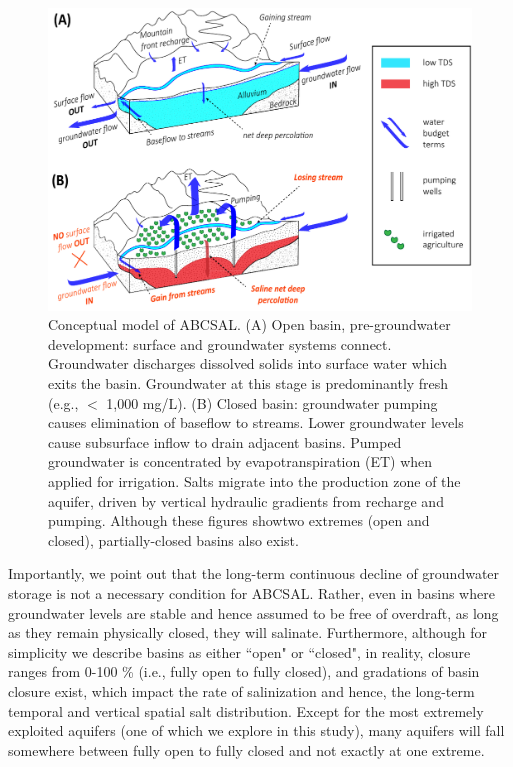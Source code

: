 \begin{figure}[ht]
	\includegraphics[width=\textwidth]{ch3_figs/mm_conceptual_model_gw_sal_2_stages.pdf}
	\caption{Conceptual model of ABCSAL. (A) Open basin, pre-groundwater development: surface and groundwater systems connect. Groundwater discharges dissolved solids into surface water which exits the basin. Groundwater at this stage is predominantly fresh (e.g., $<$ 1,000 mg/L). (B) Closed basin: groundwater pumping causes elimination of baseflow to streams. Lower groundwater levels cause subsurface inflow to drain adjacent basins. Pumped groundwater is concentrated by evapotranspiration (ET) when applied for irrigation. Salts migrate into the production zone of the aquifer, driven by vertical hydraulic gradients from recharge and pumping. Although these figures showtwo extremes (open and closed), partially-closed basins also exist.}
	\label{fig:conceptual_model_gw_sal}
\end{figure}


Importantly, we point out that the long-term continuous decline of groundwater storage is not a necessary condition for ABCSAL. Rather, even in basins where groundwater levels are stable and hence assumed to be free of overdraft, as long as they remain physically closed, they will salinate. Furthermore, although for simplicity we describe basins as either ``open" or ``closed", in reality, closure ranges from 0-100 \% (i.e., fully open to fully closed), and gradations of basin closure exist, which impact the rate of salinization and hence, the long-term temporal and vertical spatial salt distribution. Except for the most extremely exploited aquifers (one of which we explore in this study), many aquifers will fall somewhere between fully open to fully closed and not exactly at one extreme. 

